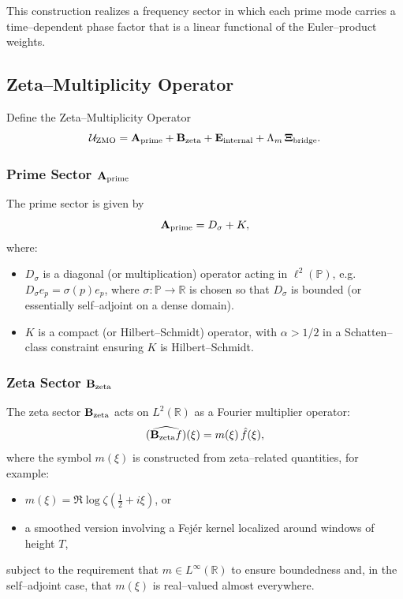 \documentclass[11pt]{article}
\begin{document}
This construction realizes a frequency sector in which each prime mode carries a time–dependent phase factor that is a linear functional of the Euler–product weights.

\subsection{Zeta–Multiplicity Operator}

Define the Zeta–Multiplicity Operator
\begin{equation}
  \mathcal{U}_{\rm ZMO}
  = \mathbf{A}_{\rm prime} + \mathbf{B}_{\rm zeta} + \mathbf{E}_{\rm internal} + \Lambda_m \,\mathbf{\Xi}_{\rm bridge}.
\end{equation}

\subsubsection{Prime Sector \(\mathbf{A}_{\rm prime}\)}

The prime sector is given by
\begin{equation}
  \mathbf{A}_{\rm prime} = D_\sigma + K,
\end{equation}
where:
\begin{itemize}
  \item \(D_\sigma\) is a diagonal (or multiplication) operator acting in \(\ell^2(\mathbb{P})\), e.g.
  \(D_\sigma e_p = \sigma(p) e_p\), where \(\sigma:\mathbb{P}\to\mathbb{R}\) is chosen so that
  \(D_\sigma\) is bounded (or essentially self–adjoint on a dense domain).
  \item \(K\) is a compact (or Hilbert–Schmidt) operator, with \(\alpha > 1/2\) in a Schatten–class constraint ensuring \(K\) is Hilbert–Schmidt.\cite{RZQC}
\end{itemize}

\subsubsection{Zeta Sector \(\mathbf{B}_{\rm zeta}\)}

The zeta sector \(\mathbf{B}_{\rm zeta}\) acts on \(L^2(\mathbb{R})\) as a Fourier multiplier operator:
\begin{equation}
  (\widehat{\mathbf{B}_{\rm zeta} f})(\xi)
  = m(\xi) \,\hat{f}(\xi),
\end{equation}
where the symbol \(m(\xi)\) is constructed from zeta–related quantities, for example:
\begin{itemize}
  \item \(m(\xi) = \Re \log \zeta(\tfrac12 + i\xi)\), or
  \item a smoothed version involving a Fejér kernel localized around windows of height \(T\),
\end{itemize}
subject to the requirement that \(m \in L^\infty(\mathbb{R})\) to ensure boundedness and, in the self–adjoint case, that \(m(\xi)\) is real–valued almost everywhere.\cite{RZQC,KeatingQC}
\end{document}
